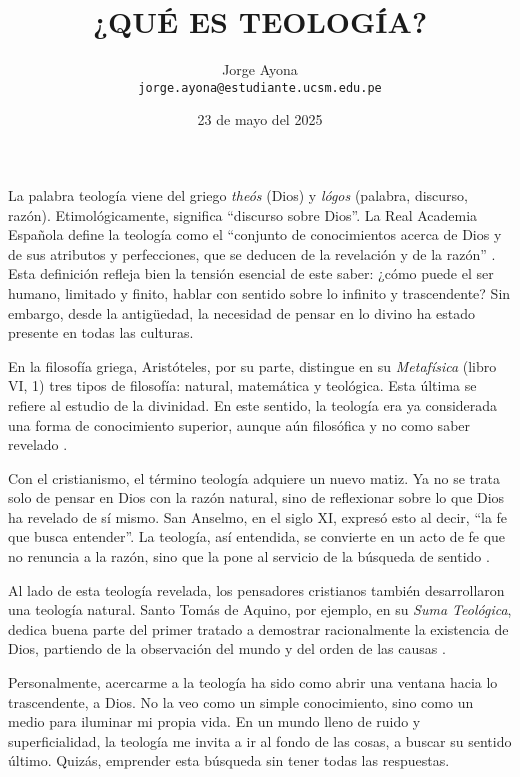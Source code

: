 \documentclass[12pt]{article}
\title{\uppercase{¿Qué Es Teología?}}
\author{Jorge Ayona \\ \texttt{jorge.ayona@estudiante.ucsm.edu.pe}}
\date{23 de mayo del 2025}
\begin{document}
	
	\maketitle
	
	La palabra teología viene del griego \textit{theós} (Dios) y \textit{lógos} (palabra, discurso, razón). Etimológicamente, significa “discurso sobre Dios”. La Real Academia Española define la teología como el “conjunto de conocimientos acerca de Dios y de sus atributos y perfecciones, que se deducen de la revelación y de la razón” \parencite[ s.v. teología]{rae2024}. Esta definición refleja bien la tensión esencial de este saber: ¿cómo puede el ser humano, limitado y finito, hablar con sentido sobre lo infinito y trascendente? Sin embargo, desde la antigüedad, la necesidad de pensar en lo divino ha estado presente en todas las culturas.
	
	En la filosofía griega, Aristóteles, por su parte, distingue en su \textit{Metafísica} (libro VI, 1) tres tipos de filosofía: natural, matemática y teológica. Esta última se refiere al estudio de la divinidad. En este sentido, la teología era ya considerada una forma de conocimiento superior, aunque aún filosófica y no como saber revelado \parencite{aristoteles2003}.
	
	Con el cristianismo, el término teología adquiere un nuevo matiz. Ya no se trata solo de pensar en Dios con la razón natural, sino de reflexionar sobre lo que Dios ha revelado de sí mismo. San Anselmo, en el siglo XI, expresó esto al decir, “la fe que busca entender”. La teología, así entendida, se convierte en un acto de fe que no renuncia a la razón, sino que la pone al servicio de la búsqueda de sentido \parencite{anselmo2005}.
	
	Al lado de esta teología revelada, los pensadores cristianos también desarrollaron una teología natural. Santo Tomás de Aquino, por ejemplo, en su \textit{Suma Teológica}, dedica buena parte del primer tratado a demostrar racionalmente la existencia de Dios, partiendo de la observación del mundo y del orden de las causas \parencite{aquinio2015}.
	
	Personalmente, acercarme a la teología ha sido como abrir una ventana hacia lo trascendente, a Dios. No la veo como un simple conocimiento, sino como un medio para iluminar mi propia vida. En un mundo lleno de ruido y superficialidad, la teología me invita a ir al fondo de las cosas, a buscar su sentido último. Quizás, emprender esta búsqueda sin tener todas las respuestas.
	
	\vspace{1cm}
	\printbibliography
	
\end{document}
